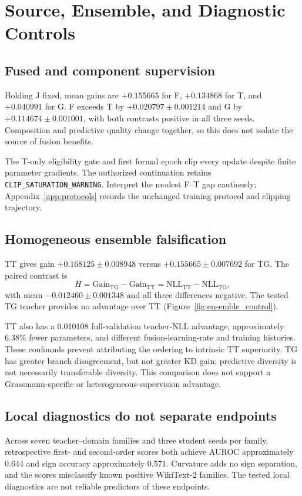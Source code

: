 \section{Source, Ensemble, and Diagnostic Controls}\label{sec:controls}

\subsection{Fused and component supervision}
\label{sec:source-ablation}
Holding J fixed, mean gains are $+0.155665$ for F, $+0.134868$ for T, and $+0.040991$ for G. F exceeds T by $+0.020797\pm0.001214$ and G by $+0.114674\pm0.001001$, with both contrasts positive in all three seeds. Composition and predictive quality change together, so this does not isolate the source of fusion benefits.

The T-only eligibility gate and first formal epoch clip every update despite finite parameter gradients. The authorized continuation retains \texttt{CLIP\_SATURATION\_WARNING}. Interpret the modest F--T gap cautiously; Appendix~\ref{app:protocols} records the unchanged training protocol and clipping trajectory.

\subsection{Homogeneous ensemble falsification}
\label{sec:homogeneous-control}
TT gives gain $+0.168125\pm0.008948$ versus $+0.155665\pm0.007692$ for TG. The paired contrast is
\begin{equation}
H=\mathrm{Gain}_{\mathrm{TG}}-\mathrm{Gain}_{\mathrm{TT}}
=\mathrm{NLL}_{\mathrm{TT}}-\mathrm{NLL}_{\mathrm{TG}},
\label{eq:ensemble-contrast}
\end{equation}
with mean $-0.012460\pm0.001348$ and all three differences negative. The tested TG teacher provides no advantage over TT (Figure~\ref{fig:ensemble_control}).

TT also has a 0.010108 full-validation teacher-NLL advantage, approximately 6.38\% fewer parameters, and different fusion-learning-rate and training histories. These confounds prevent attributing the ordering to intrinsic TT superiority. TG has greater branch disagreement, but not greater KD gain; predictive diversity is not necessarily transferable diversity. This comparison does not support a Grassmann-specific or heterogeneous-supervision advantage.

\subsection{Local diagnostics do not separate endpoints}
\label{sec:local-diagnostics}
Across seven teacher--domain families and three student seeds per family, retrospective first- and second-order scores both achieve AUROC approximately 0.644 and sign accuracy approximately 0.571. Curvature adds no sign separation, and the scores misclassify known positive WikiText-2 families. The tested local diagnostics are not reliable predictors of these endpoints.

